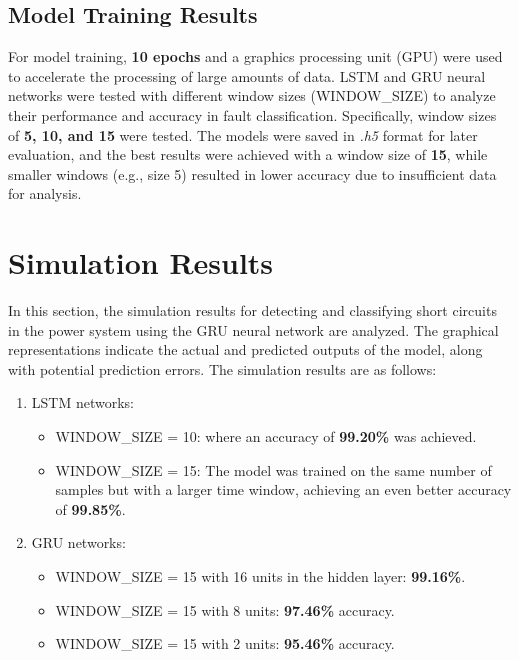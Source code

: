 \documentclass[11pt]{IEEEtran}
\begin{document}
\subsection{Model Training Results}

For model training, \textbf{10 epochs} and a graphics processing unit (GPU) were used to accelerate the processing of large amounts of data. LSTM and GRU neural networks were tested with different window sizes (WINDOW\_SIZE) to analyze their performance and accuracy in fault classification. Specifically, window sizes of \textbf{5, 10, and 15} were tested. The models were saved in \textit{.h5} format for later evaluation, and the best results were achieved with a window size of \textbf{15}, while smaller windows (e.g., size 5) resulted in lower accuracy due to insufficient data for analysis.


\section{Simulation Results}
In this section, the simulation results for detecting and classifying short circuits in the power system using the GRU neural network are analyzed. The graphical representations indicate the actual and predicted outputs of the model, along with potential prediction errors.
The simulation results are as follows:

\begin{enumerate}

    \item LSTM networks:
    \begin{itemize}
        \item WINDOW\_SIZE = 10: where an accuracy of \textbf{99.20\%} was achieved.
        \item WINDOW\_SIZE = 15: The model was trained on the same number of samples but with a larger time window, achieving an even better accuracy of \textbf{99.85\%}.
    \end{itemize}
    
    \item GRU networks:
    \begin{itemize}
        \item WINDOW\_SIZE = 15 with 16 units in the hidden layer: \textbf{99.16\%}.
        \item WINDOW\_SIZE = 15 with 8 units: \textbf{97.46\%} accuracy.
        \item WINDOW\_SIZE = 15 with 2 units: \textbf{95.46\%} accuracy.
    \end{itemize}
\end{enumerate}
\end{document}
